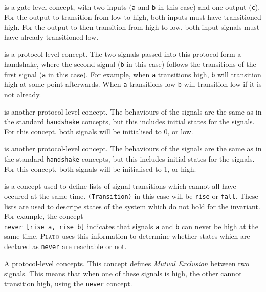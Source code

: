 \documentclass[british,technote,compsoc]{IEEEtran}
\newcommand{\noun}[1]{\textsc{#1}}
\begin{document}
\begin{description}[align=left]
  \item [\texttt{cElement a b c}] is a gate-level concept, with two inputs (\texttt{a} and \texttt{b} in this case) and one output (\texttt{c}). For the output to transition from low-to-high, 
  both inputs must have transitioned high. For the output to then transition from high-to-low, both input signals must have already transitioned low.
  
  \item [\texttt{handshake a b}] is a protocol-level concept. The two signals passed into this protocol form a handshake, where the second signal (\texttt{b} in this case) follows the 
  transitions of the first signal (\texttt{a} in this case). For example, when \texttt{a} transitions high, \texttt{b} will transition high at some point afterwards. When \texttt{a} transitions 
  low \texttt{b} will transition low if it is not already.
  
  \item [\texttt{handshake00 a b}] is another protocol-level concept. The behaviours of the signals are the same as in the standard \texttt{handshake} concepts, but this includes initial 
  states for the signals. For this concept, both signals will be initialised to 0, or low.
  
  \item [\texttt{handshake11 a b}] is another protocol-level concept. The behaviours of the signals are the same as in the standard \texttt{handshake} concepts, but this includes initial 
  states for the signals. For this concept, both signals will be initialised to 1, or high.

  \item [\texttt{never [(Transition) a, (Transition) b, ...]}] is a concept used to define lists of signal transitions which cannot all have occured at the same time. \texttt{(Transition)} in this 
  case will be \texttt{rise} or \texttt{fall}. These lists are used to descripe states of the system which do not hold for the invariant. For example, the concept \\
  \texttt{never [rise a, rise b]} indicates that signals \texttt{a} and \texttt{b} can never be high at the same time. \noun{Plato} uses this information to determine whether states which
  are declared as \texttt{never} are reachable or not. 
  
  \item [\texttt{me a b}] A protocol-level concepts. This concept defines \emph{Mutual Exclusion} between two signals. 
  This means that when one of these signals is high, the other cannot transition high, using the \texttt{never} concept.
  

\end{description}
\end{document}
